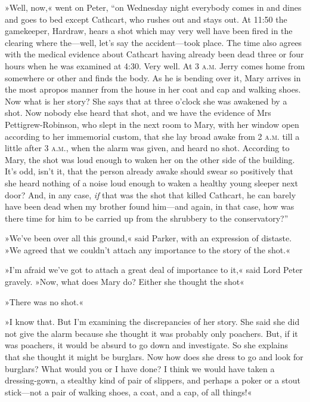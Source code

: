 »Well, now,« went on Peter, \enquote{on Wednesday night everybody comes in and dines and goes to bed except Cathcart, who rushes out and stays out. At 11:50 the gamekeeper, Hardraw, hears a shot which may very well have been fired in the clearing where the—well, let's say the accident—took place. The time also agrees with the medical evidence about Cathcart having already been dead three or four hours when he was examined at 4:30. Very well. At 3 \textsc{a.m.} Jerry comes home from somewhere or other and finds the body. As he is bending over it, Mary arrives in the most apropos manner from the house in her coat and cap and walking shoes. Now what is her story? She says that at three o'clock she was awakened by a shot. Now nobody else heard that shot, and we have the evidence of Mrs Pettigrew-Robinson, who slept in the next room to Mary, with her window open according to her immemorial custom, that she lay broad awake from 2 \textsc{a.m.} till a little after 3 \textsc{a.m.}, when the alarm was given, and heard no shot. According to Mary, the shot was loud enough to waken her on the other side of the building. It's odd, isn't it, that the person already awake should swear so positively that she heard nothing of a noise loud enough to waken a healthy young sleeper next door? And, in any case, \textit{if} that was the shot that killed Cathcart, he can barely have been dead when my brother found him—and again, in that case, how was there time for him to be carried up from the shrubbery to the conservatory?}

»We've been over all this ground,« said Parker, with an expression of distaste. »We agreed that we couldn't attach any importance to the story of the shot.«

»I'm afraid we've got to attach a great deal of importance to it,« said Lord Peter gravely. »Now, what does Mary do? Either she thought the shot\longdash«

»There was no shot.«

»I know that. But I'm examining the discrepancies of her story. She said she did not give the alarm because she thought it was probably only poachers. But, if it was poachers, it would be absurd to go down and investigate. So she explains that she thought it might be burglars.  Now how does she dress to go and look for burglars? What would you or I have done? I think we would have taken a dressing-gown, a stealthy kind of pair of slippers, and perhaps a poker or a stout stick—not a pair of walking shoes, a coat, and a cap, of all things!«

